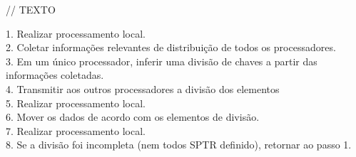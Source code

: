 // TEXTO


1. Realizar processamento local. 
\\2. Coletar informações relevantes de distribuição de todos os processadores. 
\\3. Em um único processador, inferir uma divisão de chaves a partir das informações coletadas. 
\\4. Transmitir aos outros processadores a divisão dos elementos
\\5. Realizar processamento local. 
\\6. Mover os dados de acordo com os elementos de divisão. 
\\7. Realizar processamento local. 
\\8. Se a divisão foi incompleta (nem todos SPTR definido), retornar ao passo 1.




